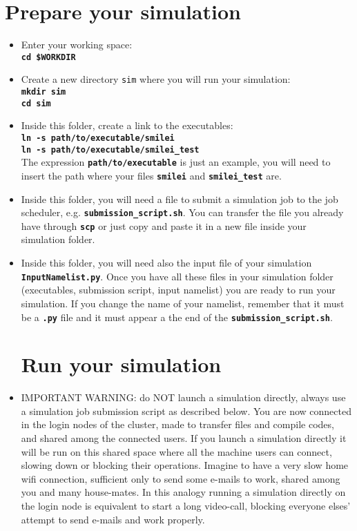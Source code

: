 \documentclass{article}
\newcommand{\commandline}[1]{\texttt{\textbf{#1}}}
\begin{document}
\section{Prepare your simulation}
\begin{itemize}


\item Enter your working space:\\
\commandline{cd \$WORKDIR}

\item Create a new directory \texttt{sim} where you will run your simulation:\\
\commandline{mkdir sim}\\
\commandline{cd sim}

\item Inside this folder, create a link to the executables:\\
\commandline{ln -s path/to/executable/smilei}\\
\commandline{ln -s path/to/executable/smilei\_test}\\
The expression \commandline{path/to/executable} is just an example, you will need to insert the path where your files \commandline{smilei} and \commandline{smilei\_test} are.

\item Inside this folder, you will need a file to submit a simulation job to the job scheduler, e.g. \commandline{submission\_script.sh}. You can transfer the file you already have through \commandline{scp} or just copy and paste it in a new file inside your simulation folder. 

\item Inside this folder, you will need also the input file of your simulation \commandline{InputNamelist.py}. Once you have all these files in your simulation folder (executables, submission script, input namelist) you are ready to run your simulation. If you change the name of your namelist,  remember that it must be a \commandline{.py} file and it must appear a the end of the \commandline{submission\_script.sh}.

\section{Run your simulation}
\item IMPORTANT WARNING: do NOT launch a simulation directly,  always use a simulation job submission script as described below. You are now connected in the login nodes of the cluster,  made to transfer files and compile codes, and shared among the connected users.  If you launch a simulation directly it will be run on this shared space where all the machine users can connect, slowing down or blocking their operations.  Imagine to have a very slow home wifi connection, sufficient only to send some e-mails to work, shared among you and many house-mates.  In this analogy running a simulation directly on the login node is equivalent to start a long video-call, blocking everyone elses' attempt to send e-mails and work properly. \\


\end{itemize}
\end{document}
